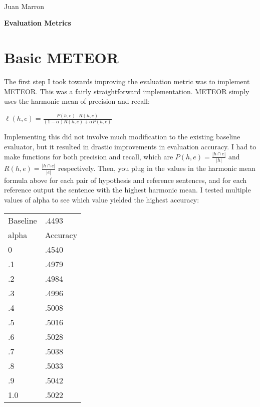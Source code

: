 \documentclass[11pt]{article}
\begin{document}
\\
Juan Marron \\

\begin{center}
\large{\bf Evaluation Metrics }
\end{center}

\section{Basic METEOR}
The first step I took towards improving the evaluation metric was to implement METEOR. This was a fairly straightforward implementation. METEOR simply uses the harmonic mean of precision and recall: \\
\begin{center}
$\ell(h,e) = \frac{P(h,e)\cdot R(h,e)}{(1-\alpha)R(h,e)+\alpha P(h,e)}$
\end{center}
Implementing this did not involve much modification to the existing baseline evaluator, but it resulted in drastic improvements in evaluation accuracy. I had to make functions for both precision and recall, which are $P(h,e) = \frac{|h\cap e|}{|h|}$ and $R(h,e) = \frac{|h\cap e|}{|e|}$ respectively. Then, you plug in the values in the harmonic mean formula above for each pair of hypothesis and reference sentences, and for each reference output the sentence with the highest harmonic mean. I tested multiple values of alpha to see which value yielded the highest accuracy: \\

\begin{table}[h]
\begin{tabular}{ll}
Baseline & .4493 \\
alpha & Accuracy \\
0     & .4540    \\
.1    & .4979    \\
.2    & .4984    \\
.3    & .4996    \\
.4    & .5008    \\
.5    & .5016    \\
.6    & .5028    \\
.7    & .5038    \\
.8    & .5033    \\
.9    & .5042    \\
1.0   & .5022   
\end{tabular}
\end{table}
\end{document}
